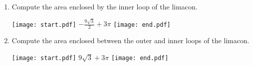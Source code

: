 \documentclass[12pt]{article}
\begin{document}
\begin{enumerate}
\begin{enumerate}

\item Compute the area enclosed by the inner loop of the limacon.

\texttt{[image: start.pdf]}
{{$-\frac{9\sqrt{3}}{2}+3\pi$}}
\texttt{[image: end.pdf]}


\item Compute the area enclosed between the outer and inner loops of the limacon.

\texttt{[image: start.pdf]}
{{$9\sqrt{3}+3\pi$}}
\texttt{[image: end.pdf]}


\end{enumerate}

\end{enumerate}
\end{document}

